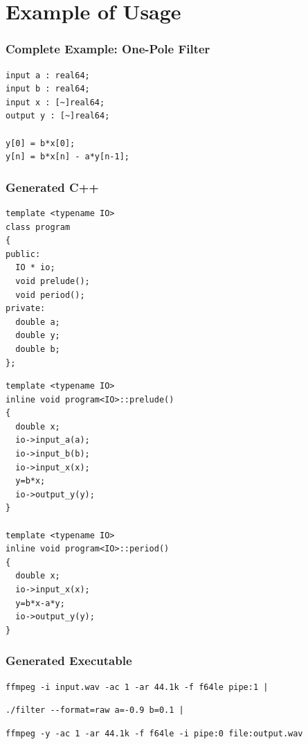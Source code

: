 \documentclass{beamer}
\begin{document}
\section{Example of Usage}

\begin{frame}[fragile]
\frametitle{Complete Example: One-Pole Filter}

\centering

\begin{BVerbatim}
input a : real64;
input b : real64;
input x : [~]real64;
output y : [~]real64;

y[0] = b*x[0];
y[n] = b*x[n] - a*y[n-1];
\end{BVerbatim}

\end{frame}


\begin{frame}[fragile]
\frametitle{Generated C++}

\footnotesize
\begin{minipage}{0.49\linewidth}
\begin{BVerbatim}
template <typename IO>
class program
{
public:
  IO * io;
  void prelude();
  void period();
private:
  double a;
  double y;
  double b;
};
\end{BVerbatim}
\end{minipage}\hfill
\begin{minipage}{0.49\linewidth}
\begin{BVerbatim}
template <typename IO>
inline void program<IO>::prelude()
{
  double x;
  io->input_a(a);
  io->input_b(b);
  io->input_x(x);
  y=b*x;
  io->output_y(y);
}

template <typename IO>
inline void program<IO>::period()
{
  double x;
  io->input_x(x);
  y=b*x-a*y;
  io->output_y(y);
}
\end{BVerbatim}
\end{minipage}

\end{frame}


\begin{frame}[fragile]
\frametitle{Generated Executable}

\small

\begin{Verbatim}
ffmpeg -i input.wav -ac 1 -ar 44.1k -f f64le pipe:1 |
\end{Verbatim}

{
\bf
\begin{Verbatim}
./filter --format=raw a=-0.9 b=0.1 |
\end{Verbatim}
}

\begin{Verbatim}
ffmpeg -y -ac 1 -ar 44.1k -f f64le -i pipe:0 file:output.wav
\end{Verbatim}

\end{frame}
\end{document}
